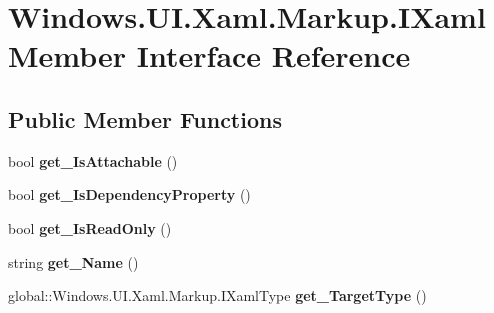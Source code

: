 \hypertarget{interface_windows_1_1_u_i_1_1_xaml_1_1_markup_1_1_i_xaml_member}{}\section{Windows.\+U\+I.\+Xaml.\+Markup.\+I\+Xaml\+Member Interface Reference}
\label{interface_windows_1_1_u_i_1_1_xaml_1_1_markup_1_1_i_xaml_member}
\subsection*{Public Member Functions}
\begin{DoxyCompactItemize}
\item 
\mbox{\label{interface_windows_1_1_u_i_1_1_xaml_1_1_markup_1_1_i_xaml_member_ac855440da9c4841678a59897db19929b}} 
bool {\bfseries get\+\_\+\+Is\+Attachable} ()
\item 
\mbox{\label{interface_windows_1_1_u_i_1_1_xaml_1_1_markup_1_1_i_xaml_member_a50958c2811365feb176ce13ae20278ff}} 
bool {\bfseries get\+\_\+\+Is\+Dependency\+Property} ()
\item 
\mbox{\label{interface_windows_1_1_u_i_1_1_xaml_1_1_markup_1_1_i_xaml_member_a64e363910e30966bb022436ab605d421}} 
bool {\bfseries get\+\_\+\+Is\+Read\+Only} ()
\item 
\mbox{\label{interface_windows_1_1_u_i_1_1_xaml_1_1_markup_1_1_i_xaml_member_a06de86d2ce3318ed9cf8e4668e6ba68e}} 
string {\bfseries get\+\_\+\+Name} ()
\item 
\mbox{\label{interface_windows_1_1_u_i_1_1_xaml_1_1_markup_1_1_i_xaml_member_a0d512a4a88e0b04167045265dbbbf5f5}} 
global\+::\+Windows.\+U\+I.\+Xaml.\+Markup.\+I\+Xaml\+Type {\bfseries get\+\_\+\+Target\+Type} ()
\item 
\mbox{\label{interface_windows_1_1_u_i_1_1_xaml_1_1_markup_1_1_i_xaml_member_aaba5576e9539838dda007eb5faaf0fd2}} 

\end{DoxyCompactItemize}
